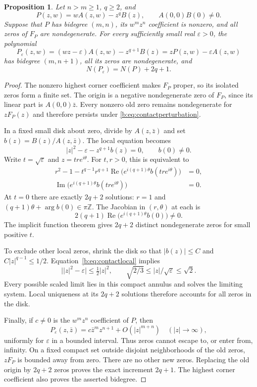 \documentclass[UTF8,11pt]{ctexart}
\newtheorem{prop}[thm]{Proposition}
\theoremstyle{definition}
\numberwithin{equation}{section}
\newcommand{\eps}{\varepsilon}\newcommand{\ep}{\varepsilon}
\DeclareMathOperator{\Rea}{Re}\DeclareMathOperator{\Ima}{Im}
\begin{document}
\begin{prop}\label{b:prop:contact}
Let $n>m\ge1$, $q\ge2$, and
\[
 P(z,w)=wA(z,w)-z^qB(z),\qquad A(0,0)B(0)\ne0.
\]
Suppose that $P$ has bidegree $(m,n)$, its $w^mz^n$ coefficient is
nonzero, and all zeros of $F_P$ are nondegenerate. For every
sufficiently small real $\eps>0$, the polynomial
\begin{equation}\label{b:eq:contactperturbation}
 P_\eps(z,w)=(wz-\eps)A(z,w)-z^{q+1}B(z)
             =zP(z,w)-\eps A(z,w)
\end{equation}
has bidegree $(m,n+1)$, all its zeros are nondegenerate, and
\[
 N(P_\eps)=N(P)+2q+1.
\]
\end{prop}
\begin{proof}
The nonzero highest corner coefficient makes $F_P$ proper, so its
isolated zeros form a finite set. The origin is a negative
nondegenerate zero of $F_P$, since its
linear part is $A(0,0)\bar z$. Every nonzero old zero remains
nondegenerate for $zF_P(z)$ and therefore persists under
\eqref{b:eq:contactperturbation}.

In a fixed small disk about zero, divide by $A(z,\bar z)$ and set
$b(z)=B(z)/A(z,\bar z)$. The local equation becomes
\begin{equation}\label{b:eq:contactlocal}
 |z|^2-\eps-z^{q+1}b(z)=0,
 \qquad b(0)\ne0.
\end{equation}
Write $t=\sqrt\eps$ and $z=tr e^{i\theta}$. For $t,r>0$, this
is equivalent to
\[
 \begin{split}
 r^2-1-t^{q-1}r^{q+1}
   \Rea\bigl(e^{i(q+1)\theta}b(tr e^{i\theta})\bigr)&=0,\\
 \Ima\bigl(e^{i(q+1)\theta}b(tr e^{i\theta})\bigr)&=0.
 \end{split}
\]
At $t=0$ there are exactly $2q+2$ solutions:
$r=1$ and $(q+1)\theta+\arg b(0)\in\pi\mathbb Z$.
The Jacobian in $(r,\theta)$ at each is
\[
 2(q+1)\Rea\bigl(e^{i(q+1)\theta}b(0)\bigr)\ne0.
\]
The implicit function theorem gives $2q+2$ distinct nondegenerate
zeros for small positive $t$.

To exclude other local zeros, shrink the disk so that $|b(z)|\le C$
and $C|z|^{q-1}\le1/2$. Equation~\eqref{b:eq:contactlocal} implies
\[
 \bigl||z|^2-\eps\bigr|\le\tfrac12|z|^2,
 \qquad \sqrt{2/3}\le |z|/\sqrt\eps\le\sqrt2.
\]
Every possible scaled limit lies in this compact annulus and solves
the limiting system. Local uniqueness at its $2q+2$ solutions
therefore accounts for all zeros in the disk.

Finally, if $c\ne0$ is the $w^mz^n$ coefficient of $P$, then
\[
 P_\eps(z,\bar z)=c\bar z^mz^{n+1}+O(|z|^{m+n})
 \quad (|z|\to\infty),
\]
uniformly for $\eps$ in a bounded interval. Thus zeros cannot
escape to, or enter from, infinity. On a fixed compact set outside
disjoint neighborhoods of the old zeros, $zF_P$ is bounded away
from zero. There are no other new zeros. Replacing the old origin
by $2q+2$ zeros proves the exact increment $2q+1$.
The highest corner coefficient also proves the asserted bidegree.
\end{proof}
\end{document}

